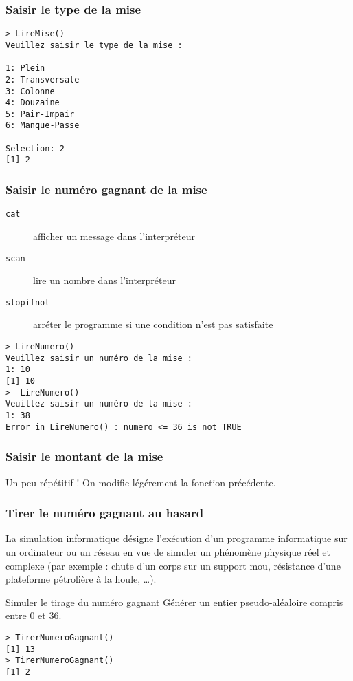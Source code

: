 \documentclass[10pt]{beamer}
\begin{document}
\begin{frame}[fragile]
  \frametitle{Saisir le type de la mise}
  
  \begin{lstlisting}
> LireMise()
Veuillez saisir le type de la mise :  

1: Plein
2: Transversale
3: Colonne
4: Douzaine
5: Pair-Impair
6: Manque-Passe

Selection: 2
[1] 2    
\end{lstlisting}

\end{frame}

\begin{frame}[fragile]
  \frametitle{Saisir le numéro gagnant de la mise}  
  \begin{description}
  \item[\texttt{cat}] afficher un message dans l'interpréteur
  \item[\texttt{scan}] lire un nombre dans l'interpréteur
  \item[\texttt{stopifnot}] arréter le programme si une condition n'est pas satisfaite
  \end{description}
  

  \begin{lstlisting}
> LireNumero()
Veuillez saisir un numéro de la mise :
1: 10
[1] 10
>  LireNumero()
Veuillez saisir un numéro de la mise :
1: 38
Error in LireNumero() : numero <= 36 is not TRUE      
\end{lstlisting}
\end{frame}


\begin{frame}[fragile]
  \frametitle{Saisir le montant de la mise}
  Un peu répétitif ! On modifie légérement la fonction précédente.
  
\end{frame}


\begin{frame}[fragile]
  \frametitle{Tirer le numéro gagnant au hasard}
    La \href{https://fr.wikipedia.org/wiki/Simulation_informatique}{simulation informatique} désigne l'exécution d'un programme informatique sur un ordinateur ou un réseau en vue de simuler un phénomène physique réel et complexe (par exemple : chute d’un corps sur un support mou, résistance d’une plateforme pétrolière à la houle, \dots).

    \begin{block}{Simuler le tirage du numéro gagnant}
      Générer un \alert{entier pseudo-aléaloire} compris entre 0 et 36.
    \end{block}
    
    \begin{lstlisting}
> TirerNumeroGagnant()
[1] 13
> TirerNumeroGagnant()
[1] 2
\end{lstlisting}
\end{frame}
\end{document}
